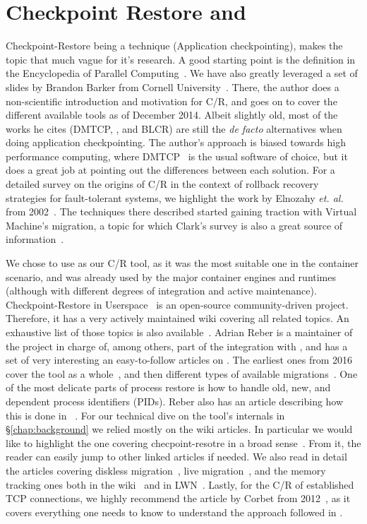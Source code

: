 \section{Checkpoint Restore and \criu}

Checkpoint-Restore being a technique (Application checkpointing), makes the topic that much vague for it's research.
A good starting point is the definition in the Encyclopedia of Parallel Computing~\cite{Schulz2011}.
We have also greatly leveraged a set of slides by Brandon Barker from Cornell University~\cite{Barker2014}.
There, the author does a non-scientific introduction and motivation for C/R, and goes on to cover the different available tools as of December 2014.
Albeit slightly old, most of the works he cites (DMTCP, \criu, and BLCR) are still the \textit{de facto} alternatives when doing application checkpointing.
The author's approach is biased towards high performance computing, where DMTCP~\cite{dmtcp} is the usual software of choice, but it does a great job at pointing out the differences between each solution.
For a detailed survey on the origins of C/R in the context of rollback recovery strategies for fault-tolerant systems, we highlight the work by Elnozahy \textit{et. al.} from 2002~\cite{Elnozahy2002}.
The techniques there described started gaining traction with Virtual Machine's migration, a topic for which Clark's survey is also a great source of information~\cite{Clark2005}.

We chose to use \criu as our C/R tool, as it was the most suitable one in the container scenario, and was already used by the major container engines and runtimes (although with different degrees of integration and active maintenance).
Checkpoint-Restore in Userspace~\cite{criu-mainpage} is an open-source community-driven project.
Therefore, it has a very actively maintained wiki covering all related topics.
An exhaustive list of those topics is also available~\cite{criu-all}.
Adrian Reber is a maintainer of the project in charge of, among others, part of the integration with \runc, and has a set of very interesting an easy-to-follow articles on \criu.
The earliest ones from 2016 cover the tool as a whole~\cite{Reber2016}, and then different types of available migrations~\cite{Reber2016b}.
One of the most delicate parts of process restore is how to handle old, new, and dependent process identifiers (PIDs).
Reber also has an article describing how this is done in \criu~\cite{Reber2019}.
For our technical dive on the tool's internals in \S\ref{chap:background} we relied mostly on the wiki articles.
In particular we would like to highlight the one covering checpoint-resotre in a broad sense~\cite{criu-checkpoint}.
From it, the reader can easily jump to other linked articles if needed.
We also read in detail the articles covering diskless migration~\cite{criu-diskless}, live migration~\cite{criu-live-migration}, and the memory tracking ones both in the wiki~\cite{criu-memory-tracking} and in LWN~\cite{criu-memory-tracking-lwn}.
Lastly, for the C/R of established TCP connections, we highly recommend the article by Corbet from 2012~\cite{Corbet12}, as it covers everything one needs to know to understand the approach followed in \criu.

